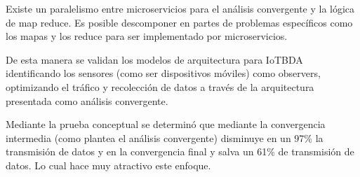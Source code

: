 Existe un paralelismo entre microservicios para el análisis convergente y la lógica de map reduce. Es posible descomponer en partes de problemas específicos como los mapas y los reduce para ser implementado por microservicios. 


De esta manera se validan los modelos de arquitectura para IoTBDA identificando los sensores (como ser dispositivos móviles) como observers, optimizando el tráfico y recolección de datos a través de la arquitectura presentada como análisis convergente.


Mediante la prueba conceptual se determinó que mediante la convergencia intermedia (como plantea el análisis convergente)  disminuye en un 97\% la transmisión de datos y en la convergencia final y salva un 61\% de transmisión de datos. Lo cual hace muy atractivo este enfoque. 
